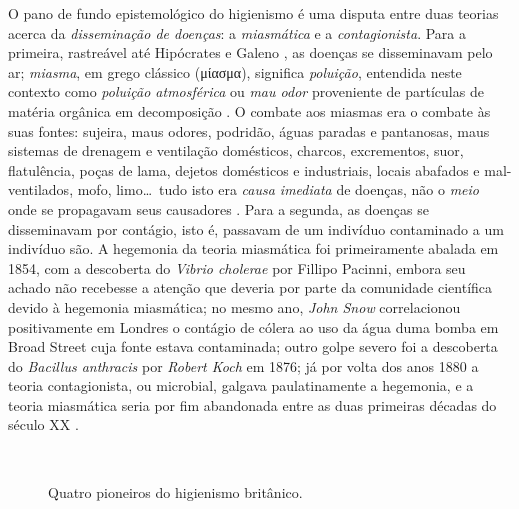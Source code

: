 O pano de fundo epistemológico do higienismo é uma disputa entre duas teorias acerca da \textit{disseminação de doenças}: a \textit{miasmática} e a \textit{contagionista}. Para a primeira, rastreável até Hipócrates e Galeno \cite{sterner_miasmic_2007}, as doenças se disseminavam pelo ar; \textit{miasma}, em grego clássico (\textgreek{μίασμα}), significa \textit{poluição}, entendida neste contexto como \textit{poluição atmosférica} ou \textit{mau odor} proveniente de partículas de matéria orgânica em decomposição \cite{mehlhorn2008encyclopedia}. O combate aos miasmas era o combate às suas fontes: sujeira, maus odores, podridão, águas paradas e pantanosas, maus sistemas de drenagem e ventilação domésticos, charcos, excrementos, suor, flatulência, poças de lama, dejetos domésticos e industriais, locais abafados e mal-ventilados, mofo, limo\dots\ tudo isto era \textit{causa imediata} de doenças, não o \textit{meio} onde se propagavam seus causadores \cite{baldwin_air_2003,halliday_miaslond_2001}. Para a segunda, as doenças se disseminavam por contágio, isto é, passavam de um indivíduo contaminado a um indivíduo são. A hegemonia da teoria miasmática foi primeiramente abalada em 1854, com a descoberta do \textit{Vibrio cholerae} por Fillipo Pacinni, embora seu achado não recebesse a atenção que deveria por parte da comunidade científica devido à hegemonia miasmática; no mesmo ano, \textit{John Snow} correlacionou positivamente em Londres o contágio de cólera ao uso da água duma bomba em Broad Street cuja fonte estava contaminada; outro golpe severo foi a descoberta do \textit{Bacillus anthracis} por \textit{Robert Koch} em 1876; já por volta dos anos 1880 a teoria contagionista, ou microbial, galgava paulatinamente a hegemonia, e a teoria miasmática seria por fim abandonada entre as duas primeiras décadas do século XX \cite{bynum_histmed_2011,mehlhorn2008encyclopedia}.

\begin{figure}[!htp]
\centering
{}
\  %
\  %
\  %
\caption{Quatro pioneiros do higienismo britânico.}
\end{figure}

